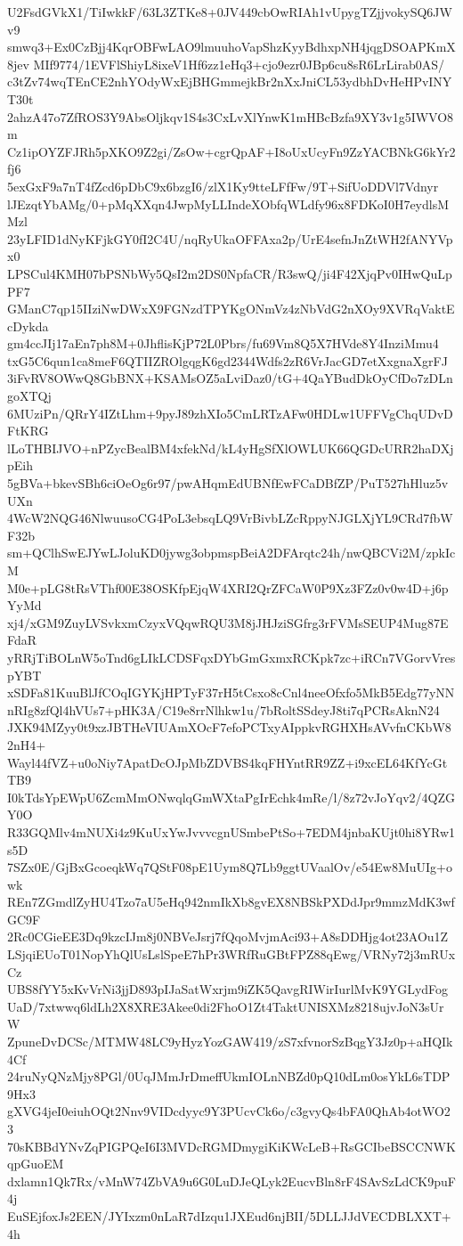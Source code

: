 U2FsdGVkX1/TiIwkkF/63L3ZTKe8+0JV449cbOwRIAh1vUpygTZjjvokySQ6JWv9
smwq3+Ex0CzBjj4KqrOBFwLAO9lmuuhoVapShzKyyBdhxpNH4jqgDSOAPKmX8jev
MIf9774/1EVFlShiyL8ixeV1Hf6zz1eHq3+cjo9ezr0JBp6cu8sR6LrLirab0AS/
c3tZv74wqTEnCE2nhYOdyWxEjBHGmmejkBr2nXxJniCL53ydbhDvHeHPvINYT30t
2ahzA47o7ZfROS3Y9AbsOljkqv1S4s3CxLvXlYnwK1mHBcBzfa9XY3v1g5IWVO8m
Cz1ipOYZFJRh5pXKO9Z2gi/ZsOw+cgrQpAF+I8oUxUcyFn9ZzYACBNkG6kYr2fj6
5exGxF9a7nT4fZcd6pDbC9x6bzgI6/zlX1Ky9tteLFfFw/9T+SifUoDDVl7Vdnyr
lJEzqtYbAMg/0+pMqXXqn4JwpMyLLIndeXObfqWLdfy96x8FDKoI0H7eydlsMMzl
23yLFID1dNyKFjkGY0fI2C4U/nqRyUkaOFFAxa2p/UrE4sefnJnZtWH2fANYVpx0
LPSCul4KMH07bPSNbWy5QsI2m2DS0NpfaCR/R3swQ/ji4F42XjqPv0IHwQuLpPF7
GManC7qp15IIziNwDWxX9FGNzdTPYKgONmVz4zNbVdG2nXOy9XVRqVaktEcDykda
gm4ccJIj17aEn7ph8M+0JhflisKjP72L0Pbrs/fu69Vm8Q5X7HVde8Y4InziMmu4
txG5C6qun1ca8meF6QTIIZROlgqgK6gd2344Wdfs2zR6VrJacGD7etXxgnaXgrFJ
3iFvRV8OWwQ8GbBNX+KSAMsOZ5aLviDaz0/tG+4QaYBudDkOyCfDo7zDLngoXTQj
6MUziPn/QRrY4IZtLhm+9pyJ89zhXIo5CmLRTzAFw0HDLw1UFFVgChqUDvDFtKRG
lLoTHBIJVO+nPZycBealBM4xfekNd/kL4yHgSfXlOWLUK66QGDcURR2haDXjpEih
5gBVa+bkevSBh6ciOeOg6r97/pwAHqmEdUBNfEwFCaDBfZP/PuT527hHluz5vUXn
4WcW2NQG46NlwuusoCG4PoL3ebsqLQ9VrBivbLZcRppyNJGLXjYL9CRd7fbWF32b
sm+QClhSwEJYwLJoluKD0jywg3obpmspBeiA2DFArqtc24h/nwQBCVi2M/zpkIcM
M0e+pLG8tRsVThf00E38OSKfpEjqW4XRI2QrZFCaW0P9Xz3FZz0v0w4D+j6pYyMd
xj4/xGM9ZuyLVSvkxmCzyxVQqwRQU3M8jJHJziSGfrg3rFVMsSEUP4Mug87EFdaR
yRRjTiBOLnW5oTnd6gLIkLCDSFqxDYbGmGxmxRCKpk7zc+iRCn7VGorvVrespYBT
xSDFa81KuuBlJfCOqIGYKjHPTyF37rH5tCsxo8cCnl4neeOfxfo5MkB5Edg77yNN
nRIg8zfQl4hVUs7+pHK3A/C19e8rrNlhkw1u/7bRoltSSdeyJ8ti7qPCRsAknN24
JXK94MZyy0t9xzJBTHeVIUAmXOcF7efoPCTxyAIppkvRGHXHsAVvfnCKbW82nH4+
Wayl44fVZ+u0oNiy7ApatDcOJpMbZDVBS4kqFHYntRR9ZZ+i9xcEL64KfYcGtTB9
I0kTdsYpEWpU6ZcmMmONwqlqGmWXtaPgIrEchk4mRe/l/8z72vJoYqv2/4QZGY0O
R33GQMlv4mNUXi4z9KuUxYwJvvvcgnUSmbePtSo+7EDM4jnbaKUjt0hi8YRw1s5D
7SZx0E/GjBxGcoeqkWq7QStF08pE1Uym8Q7Lb9ggtUVaalOv/e54Ew8MuUIg+owk
REn7ZGmdlZyHU4Tzo7aU5eHq942nmIkXb8gvEX8NBSkPXDdJpr9mmzMdK3wfGC9F
2Rc0CGieEE3Dq9kzcIJm8j0NBVeJsrj7fQqoMvjmAci93+A8sDDHjg4ot23AOu1Z
LSjqiEUoT01NopYhQlUsLslSpeE7hPr3WRfRuGBtFPZ88qEwg/VRNy72j3mRUxCz
UBS8fYY5xKvVrNi3jjD893pIJaSatWxrjm9iZK5QavgRIWirIurlMvK9YGLydFog
UaD/7xtwwq6ldLh2X8XRE3Akee0di2FhoO1Zt4TaktUNISXMz8218ujvJoN3sUrW
ZpuneDvDCSc/MTMW48LC9yHyzYozGAW419/zS7xfvnorSzBqgY3Jz0p+aHQIk4Cf
24ruNyQNzMjy8PGl/0UqJMmJrDmeffUkmIOLnNBZd0pQ10dLm0osYkL6sTDP9Hx3
gXVG4jeI0eiuhOQt2Nnv9VIDcdyyc9Y3PUcvCk6o/c3gvyQs4bFA0QhAb4otWO23
70sKBBdYNvZqPIGPQeI6I3MVDcRGMDmygiKiKWcLeB+RsGCIbeBSCCNWKqpGuoEM
dxlamn1Qk7Rx/vMnW74ZbVA9u6G0LuDJeQLyk2EucvBln8rF4SAvSzLdCK9puF4j
EuSEjfoxJs2EEN/JYIxzm0nLaR7dIzqu1JXEud6njBII/5DLLJJdVECDBLXXT+4h
